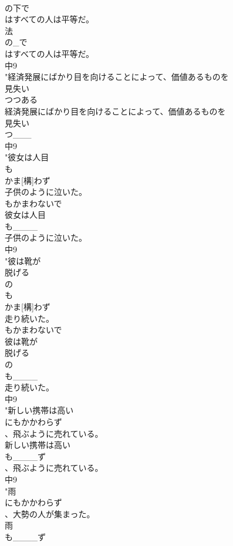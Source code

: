 \documentclass[8pt]{extreport}
\begin{document}
\begin{CJK}{UTF8}{min}
\\	の下で
\\	はすべての人は平等だ。 
\\	法
\\	の_で
\\	はすべての人は平等だ。 
\\	中9
\\	"経済発展にばかり目を向けることによって、価値あるものを
\\	見失い
\\	つつある
\\	経済発展にばかり目を向けることによって、価値あるものを
\\	見失い
\\	つ___
\\	中9
\\	"彼女は人目
\\	も
\\	かま[構]わず
\\	子供のように泣いた。 
\\	もかまわないで
\\	彼女は人目
\\	も____
\\	子供のように泣いた。
\\	中9
\\	"彼は靴が
\\	脱げる
\\	の
\\	も
\\	かま[構]わず
\\	走り続いた。 
\\	もかまわないで
\\	彼は靴が
\\	脱げる
\\	の
\\	も____
\\	走り続いた。
\\	中9
\\	"新しい携帯は高い
\\	にもかかわらず
\\	、飛ぶように売れている。
\\	新しい携帯は高い
\\	も____ず
\\	、飛ぶように売れている。
\\	中9
\\	"雨
\\	にもかかわらず
\\	、大勢の人が集まった。
\\	雨
\\	も____ず

\end{CJK}
\end{document}
